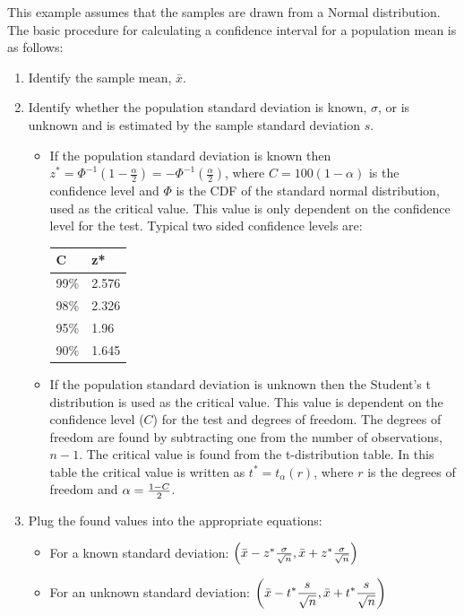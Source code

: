 \documentclass{tufte-handout}\usepackage[]{graphicx}\usepackage[]{color}
\begin{document}
This example assumes that the samples are drawn from a Normal distribution. The basic procedure for calculating a confidence interval for a population mean is as follows:
\begin{enumerate}
  \item Identify the sample mean, $\bar{x}$.
  
  \item Identify whether the population standard deviation is known, $\sigma$, or is unknown and is estimated by the sample standard deviation $s$.
  
  \begin{itemize}
    \item If the population standard deviation is known then $z^{*}=\Phi ^{-1}\left(1-{\frac {\alpha }{2}}\right)=-\Phi ^{-1}\left({\frac {\alpha }{2}}\right)$, where $C=100(1-\alpha)$ is the confidence level and $\Phi$  is the CDF of the standard normal distribution, used as the critical value. This value is only dependent on the confidence level for the test. Typical two sided confidence levels are:
    
\begin{table}
\begin{tabular}{ll}
C	    & z* \\ \hline
99\%	  & 2.576 \\
98\%	  & 2.326 \\
95\%	  & 1.96 \\
90\%	  & 1.645 \\
\end{tabular}
\end{table}

\item If the population standard deviation is unknown then the Student's t distribution is used as the critical value. This value is dependent on the confidence level ($C$) for the test and degrees of freedom. The degrees of freedom are found by subtracting one from the number of observations, $n − 1$. The critical value is found from the t-distribution table. In this table the critical value is written as $t^{*}=t_{\alpha }(r)$, where $r$ is the degrees of freedom and $\alpha ={1-C \over 2}$.

  \end{itemize}

\item Plug the found values into the appropriate equations:

\begin{itemize}
  \item For a known standard deviation: $\left({\bar {x}}-z^{*}{\sigma \over {\sqrt {n}}},{\bar {x}}+z^{*}{\sigma \over {\sqrt {n}}}\right)$

  \item For an unknown standard deviation: $\displaystyle \left({\bar {x}}-t^{*}{s \over {\sqrt {n}}},{\bar {x}}+t^{*}{s \over {\sqrt {n}}}\right)$
\end{itemize}

\end{enumerate}
\end{document}
